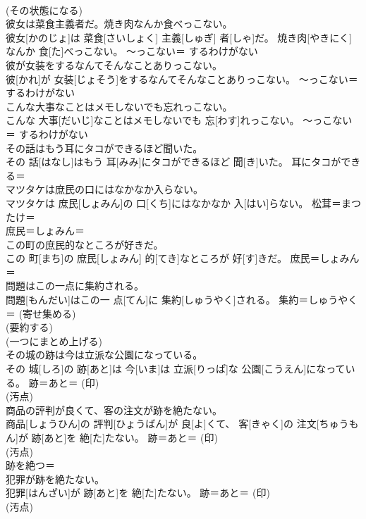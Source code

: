\documentclass[8pt]{extreport}
\begin{document}
\begin{CJK}{UTF8}{min}
{\\	(その状態になる)
\\	彼女は菜食主義者だ。焼き肉なんか食べっこない。	
\\	彼女[かのじょ]は 菜食[さいしょく] 主義[しゅぎ] 者[しゃ]だ。 焼き肉[やきにく]なんか 食[た]べっこない。	〜っこない＝ するわけがない
\\	彼が女装をするなんてそんなことありっこない。	
\\	彼[かれ]が 女装[じょそう]をするなんてそんなことありっこない。	〜っこない＝ するわけがない
\\	こんな大事なことはメモしないでも忘れっこない。	
\\	こんな 大事[だいじ]なことはメモしないでも 忘[わす]れっこない。	〜っこない＝ するわけがない
\\	その話はもう耳にタコができるほど聞いた。	
\\	その 話[はなし]はもう 耳[みみ]にタコができるほど 聞[き]いた。	耳にタコができる＝ 
\\	マツタケは庶民の口にはなかなか入らない。	
\\	マツタケは 庶民[しょみん]の 口[くち]にはなかなか 入[はい]らない。	松茸＝まつたけ＝ 
\\	庶民＝しょみん＝ 
\\	この町の庶民的なところが好きだ。	
\\	この 町[まち]の 庶民[しょみん] 的[てき]なところが 好[す]きだ。	庶民＝しょみん＝ 
\\	問題はこの一点に集約される。	
\\	問題[もんだい]はこの一 点[てん]に 集約[しゅうやく]される。	集約＝しゅうやく＝ (寄せ集める) 
\\	(要約する) 
\\	(一つにまとめ上げる) 
\\	その城の跡は今は立派な公園になっている。	
\\	その 城[しろ]の 跡[あと]は 今[いま]は 立派[りっぱ]な 公園[こうえん]になっている。	跡＝あと＝ (印) 
\\	(汚点) 
\\	商品の評判が良くて、客の注文が跡を絶たない。	
\\	商品[しょうひん]の 評判[ひょうばん]が 良[よ]くて、 客[きゃく]の 注文[ちゅうもん]が 跡[あと]を 絶[た]たない。	跡＝あと＝ (印) 
\\	(汚点) 
\\	跡を絶つ＝ 
\\	犯罪が跡を絶たない。	
\\	犯罪[はんざい]が 跡[あと]を 絶[た]たない。	跡＝あと＝ (印) 
\\	(汚点) 
}
\end{CJK}
\end{document}
